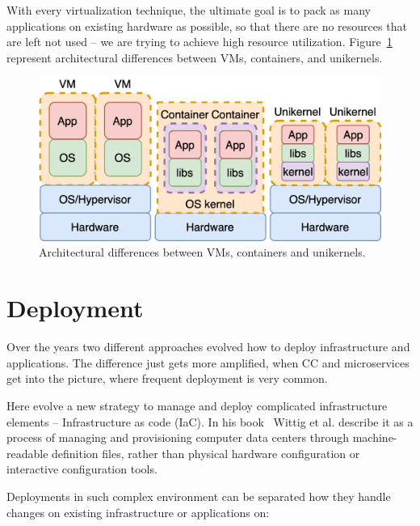 \noindent
With every virtualization technique, the ultimate goal is to pack as many applications on existing hardware as possible, so that there are no resources that are left not used -- we are trying to achieve high resource utilization. Figure~\ref{fig:fig5} represent architectural differences between VMs, containers, and unikernels.

\begin{figure}[H]
	\begin{center}
		\includegraphics[scale=0.9]{images/Figure5.png}
	\end{center}
	\vspace{-0.6cm}
	\caption{Architectural differences between VMs, containers and unikernels.}
	\label{fig:fig5}
\end{figure}
%
%
\section{Deployment}\label{sec:deployment}
%
Over the years two different approaches evolved how to deploy infrastructure and applications. The difference just gets more amplified, when CC and microservices get into the picture, where frequent deployment is very common. 

Here evolve a new strategy to manage and deploy complicated infrastructure elements -- Infrastructure as code (IaC). In his book~\cite{wittig2018amazon} Wittig et al. describe it as a process of managing and provisioning computer data centers through machine-readable definition files, rather than physical hardware configuration or interactive configuration tools.

Deployments in such complex environment can be separated how they handle changes on existing infrastructure or applications on:


